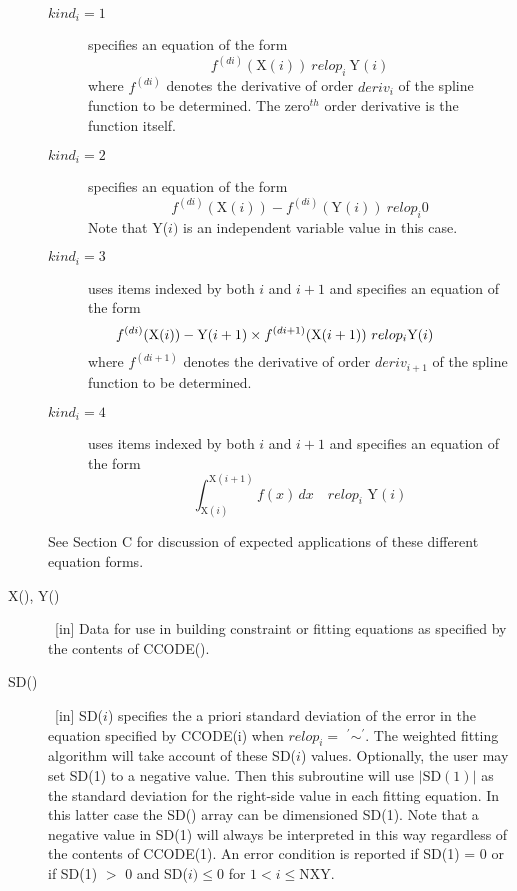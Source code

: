 \documentclass[twoside]{MATH77}
\begin{document}
\begin{description}
\begin{description}
\item[\rm $kind_i = 1$]  specifies an equation of the form
\begin{equation*}
f^{(di)}(\text{X}(i))\ relop_i\ \text{Y}(i)
\end{equation*}
where $f^{(di)}$ denotes the derivative of order $deriv_i$ of the spline
function to be determined. The zero$^{th}$ order derivative is the function
itself.

\item[\rm $kind_i = 2$]  specifies an equation of the form
\begin{equation*}
f^{(di)}(\text{X}(i))-f^{(di)}(\text{Y}(i))\ relop_i0
\end{equation*}
Note that Y($i)$ is an independent variable value in this case.

\item[\rm $kind_i = 3$]  uses items indexed by both $i$ and $i+1$ and
specifies an equation of the form
\begin{equation*}
\hspace{-36pt}f^{(di)}(\text{X}(i))-\text{Y}(i+1)\times f^{(di+1)}
(\text{X}(i+1))\ relop_i \text{Y}(i)
\end{equation*}
where $f^{(di+1)}$ denotes the derivative of order $deriv_{i+1}$ of the
spline function to be determined.

\item[\rm $kind_i = 4$]  uses items indexed by both $i$ and $i+1$ and
specifies an equation of the form
\begin{equation*}
\int_{\text{X}(i)}^{\text{X}(i+1)}f(x)\,dx\quad relop_i\text{ Y}(i)
\end{equation*}
\end{description}
See Section C for discussion of expected applications of these different
equation forms.

\item[X(), Y()]  \ [in] Data for use in building constraint or fitting
equations as specified by the contents of CCODE().

\item[SD()]  \ [in] SD($i$) specifies the a priori standard deviation of the
error in the equation specified by CCODE(i) when $relop_i=$ $^{\prime
}{\sim }^{\prime }$. The weighted fitting algorithm will take account of these
SD($i$) values. Optionally, the user may set SD(1) to a negative value. Then
this subroutine will use $|\text{SD}(1)|$ as the standard deviation for the
right-side value in each fitting equation. In this latter case the SD()
array can be dimensioned SD(1). Note that a negative value in SD(1) will
always be interpreted in this way regardless of the contents of CCODE(1). An
error condition is reported if SD(1) = 0 or if SD(1) $>$ 0 and
SD($i) \leq 0$ for $1 < i \leq \text{NXY}.$


\end{description}
\end{document}
